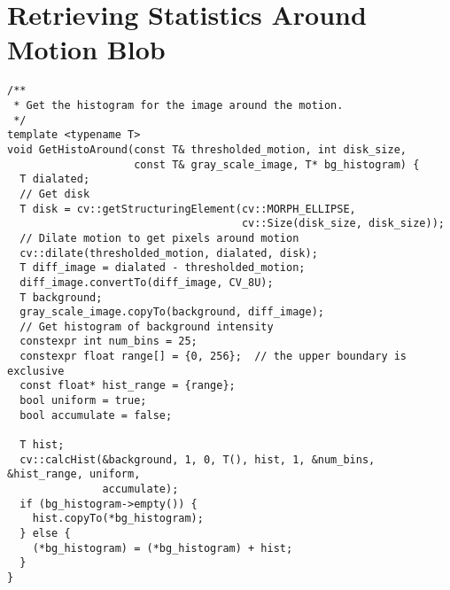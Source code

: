 \chapter{\label{ap:dilate}Retrieving Statistics Around Motion Blob}
\begin{verbatim}
/**
 * Get the histogram for the image around the motion.
 */
template <typename T>
void GetHistoAround(const T& thresholded_motion, int disk_size,
                    const T& gray_scale_image, T* bg_histogram) {
  T dialated;
  // Get disk
  T disk = cv::getStructuringElement(cv::MORPH_ELLIPSE,
                                     cv::Size(disk_size, disk_size));
  // Dilate motion to get pixels around motion
  cv::dilate(thresholded_motion, dialated, disk);
  T diff_image = dialated - thresholded_motion;
  diff_image.convertTo(diff_image, CV_8U);
  T background;
  gray_scale_image.copyTo(background, diff_image);
  // Get histogram of background intensity
  constexpr int num_bins = 25;
  constexpr float range[] = {0, 256};  // the upper boundary is exclusive
  const float* hist_range = {range};
  bool uniform = true;
  bool accumulate = false;

  T hist;
  cv::calcHist(&background, 1, 0, T(), hist, 1, &num_bins, &hist_range, uniform,
               accumulate);
  if (bg_histogram->empty()) {
    hist.copyTo(*bg_histogram);
  } else {
    (*bg_histogram) = (*bg_histogram) + hist;
  }
}
\end{verbatim}
